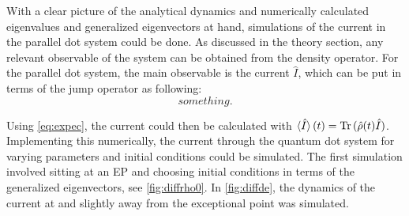 \documentclass[../main.tex]{subfiles}
\begin{document}
With a clear picture of the analytical dynamics and numerically calculated eigenvalues and generalized eigenvectors at hand, simulations of the current in the parallel dot system could be done. As discussed in the theory section, any relevant observable of the system can be obtained from the density operator. For the parallel dot system, the main observable is the current $\hat I$, which can be put in terms of the jump operator as following:
\begin{equation}
    something.
\end{equation}

Using \cref{eq:expec}, the current could then be calculated with $\braket{\hat I}(t) = \operatorname{Tr}{(\hat \rho(t)\hat I)}$. Implementing this numerically, the current through the quantum dot system for varying parameters and initial conditions could be simulated. The first simulation involved sitting at an EP and choosing initial conditions in terms of the generalized eigenvectors, see \cref{fig:diffrho0}. In \cref{fig:diffde}, the dynamics of the current at and slightly away from the exceptional point was simulated.
\end{document}
